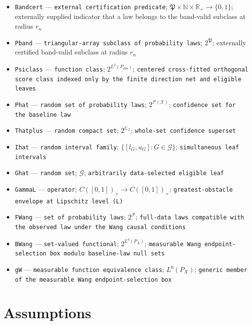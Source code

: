 \documentclass{article}
\begin{document}
\begin{itemize}
  \item \texttt{Bandcert} --- \texttt{external certification predicate}; \(\mathfrak P\times\mathbb N\times\mathbb R_+\to\{0,1\}\); externally supplied indicator that a law belongs to the band-valid subclass at radius \(r_n\)
  \item \texttt{Pband} --- \texttt{triangular-\allowbreak{}array subclass of probability laws}; \(2^{\mathfrak P}\); externally certified band-valid subclass at radius \(r_n\)
  \item \texttt{Psiclass} --- \texttt{function class}; \(2^{L^2(P_{\mathrm{obs}})}\); \texttt{centered cross-\allowbreak{}fitted orthogonal score class indexed only by the finite direction net and eligible leaves}
  \item \texttt{Phat} --- \texttt{random set of probability laws}; \(2^{\mathcal P(\mathcal X)}\); \texttt{confidence set for the baseline law}
  \item \texttt{Thatplus} --- \texttt{random compact set}; \(2^{\mathbb C_{\mathcal Z}}\); \texttt{whole-\allowbreak{}set confidence superset}
  \item \texttt{Ihat} --- \texttt{random interval family}; \(\{[l_G,u_G]:G\in\mathcal G\}\); \texttt{simultaneous leaf intervals}
  \item \texttt{Ghat} --- \texttt{random set}; \(\mathcal G\); \texttt{arbitrarily data-\allowbreak{}selected eligible leaf}
  \item \texttt{GammaL} --- \texttt{operator}; \(C([0,1])_+\to C([0,1])_+\); \texttt{greatest-\allowbreak{}obstacle envelope at Lipschitz level (L)}
  \item \texttt{FWang} --- \texttt{set of probability laws}; \(2^{\mathcal P}\); \texttt{full-\allowbreak{}data laws compatible with the observed law under the Wang causal conditions}
  \item \texttt{BWang} --- \texttt{set-\allowbreak{}valued functional}; \(2^{L^0(P_X)}\); \texttt{measurable Wang endpoint-\allowbreak{}selection box modulo baseline-\allowbreak{}law null sets}
  \item \texttt{gW} --- \texttt{measurable function equivalence class}; \(L^0(P_X)\); \texttt{generic member of the measurable Wang endpoint-\allowbreak{}selection box}
\end{itemize}

\section{Assumptions}
\end{document}
